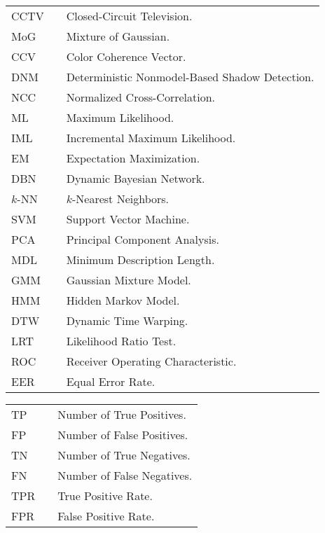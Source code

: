 \begin{table}[h]
    \begin{tabular}{lll}
        CCTV   & & Closed-Circuit Television. \\
        MoG    & & Mixture of Gaussian. \\
        CCV    & & Color Coherence Vector. \\
        DNM    & & Deterministic Nonmodel-Based Shadow Detection. \\
        NCC    & & Normalized Cross-Correlation. \\
        ML     & & Maximum Likelihood. \\
        IML    & & Incremental Maximum Likelihood. \\
        EM     & & Expectation Maximization. \\  
        DBN    & & Dynamic Bayesian Network. \\
        $k$-NN & & $k$-Nearest Neighbors. \\
        SVM    & & Support Vector Machine. \\
        PCA    & & Principal Component Analysis. \\
        MDL    & & Minimum Description Length. \\
        GMM    & & Gaussian Mixture Model. \\
        HMM    & & Hidden Markov Model. \\
        DTW    & & Dynamic Time Warping. \\ 
        LRT    & & Likelihood Ratio Test. \\
        ROC    & & Receiver Operating Characteristic. \\
        EER    & & Equal Error Rate.
    \end{tabular}
\end{table}

\newpage

\begin{table}[h]
    \begin{tabular}{lll}
        TP     & & Number of True Positives. \\ 
        FP     & & Number of False Positives. \\
        TN     & & Number of True Negatives. \\ 
        FN     & & Number of False Negatives. \\
        TPR    & & True Positive Rate. \\ 
        FPR    & & False Positive Rate. 
    \end{tabular}
\end{table}

\setlength{\parskip}{12pt}

